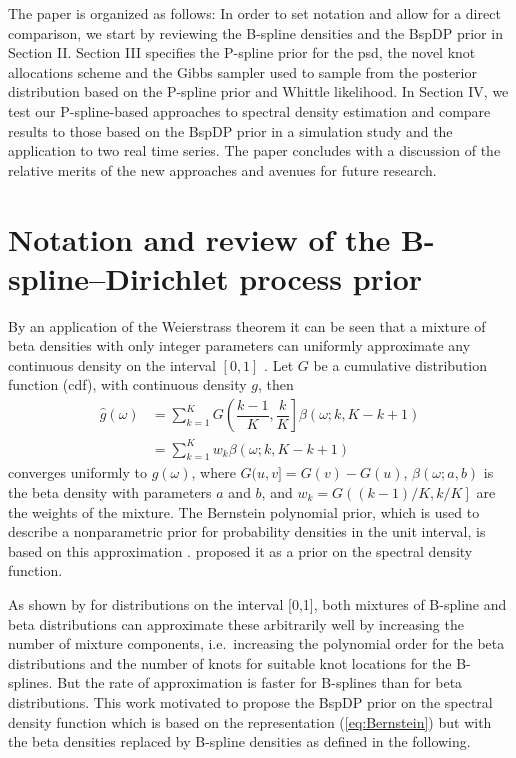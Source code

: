 \documentclass[twocolumn,final]{svjour3}
\newcommand{\pmr}{ \color{red}}
\begin{document}
The paper is organized as follows: In order to set notation and allow for a direct comparison, we start by
reviewing the B-spline densities and the BspDP prior in Section II. Section III specifies the P-spline prior for the psd, the novel knot allocations scheme and the Gibbs sampler used to sample from the posterior distribution based on the P-spline prior and Whittle likelihood.  In Section IV, we test our P-spline-based approaches to spectral density estimation and compare results to those based on the BspDP prior in a simulation study and the application to two real time series. The paper concludes with a discussion of the relative merits of the new approaches and avenues for future research.

\section{Notation and review of the B-spline--Dirichlet process prior}

By an application of the Weierstrass theorem it can be seen that a mixture of beta densities with only integer parameters can uniformly approximate any continuous density  on the interval $[0,1]$ \citep{Choudhuri:2004}.  Let $G$ be a cumulative distribution function (cdf), with continuous density $g$, then 
\begin{align}
\label{eq:Bernstein}
\widehat{g}(\omega) &= \sum_{k=1}^{K} G \left( \dfrac{k-1}{K} , \dfrac{k}{K} \right] \beta(\omega; k, K-k+1)\\
&= \sum_{k=1}^{K} w_k \beta(\omega; k, K-k+1) \nonumber
\end{align}	  
converges uniformly to $g(\omega)$, where $G(u,v] = G(v) - G(u)$, $\beta(\omega; a,b)$ is the beta density with parameters $a$ and $b$, and $w_k=G\left((k-1)/K, k/K \right]$ are the weights of the mixture.
The Bernstein polynomial prior, which is used to describe a nonparametric prior for probability densities in the unit interval, is based on this approximation \citep{Petrone:1999a,Petrone:199b}.  \cite{Choudhuri:2004} proposed it as a prior on the spectral density function.

{\pmr As shown by \cite{Perron:2001} for distributions on the interval [0,1], both mixtures of B-spline and beta distributions can approximate these arbitrarily well by increasing the number of mixture components, i.e.\ increasing the polynomial order for the beta distributions and the number of knots for suitable knot locations for the B-splines. But the rate of approximation is faster for B-splines than for beta distributions.}
This work motivated \cite{Edwards2019} to propose the BspDP prior on the spectral density function which is based on the representation (\ref{eq:Bernstein}) but with
the beta densities replaced by B-spline densities as defined in the following.
\end{document}
